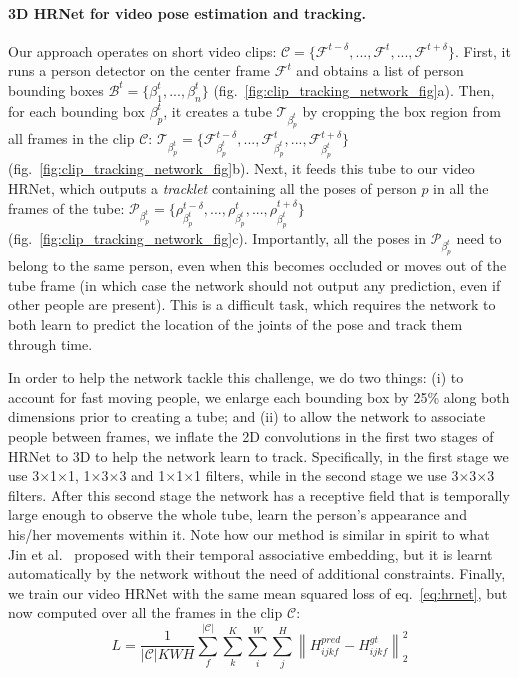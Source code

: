 \documentclass[10pt,twocolumn,letterpaper]{article}
\begin{document}
\paragraph{3D HRNet for video pose estimation and tracking.} Our approach operates on short video clips: {\small $\mathcal{C} = \{\mathcal{F}^{t-\delta}, ..., \mathcal{F}^t, ..., \mathcal{F}^{t+\delta}\}$}. 
First, it runs a person detector on the center frame $\mathcal{F}^t$ and obtains a list of person bounding boxes {\small $\mathcal{B}^t = \{\beta_1^t, ..., \beta_n^t\}$} (fig.~\ref{fig:clip_tracking_network_fig}{\color{red}a}).
Then, for each bounding box {\small $\beta_p^t$}, it creates a tube {\small $\mathcal{T}_{\beta_p^t}$}  by cropping the box region from all frames in the clip {\small $\mathcal{C}$: $\mathcal{T}_{\beta_p^t}= \{ \mathcal{F}_{\beta_p^t}^{t-\delta}, ..., \mathcal{F}_{\beta_p^t}^t, ..., \mathcal{F}_{\beta_p^t}^{t+\delta}\}$} (fig.~\ref{fig:clip_tracking_network_fig}{\color{red}b}). Next, it feeds this tube to our video HRNet, which outputs a {\it tracklet} containing all the poses of person $p$ in all the frames of the tube: {\small $\mathcal{P}_{\beta_p^t} = \{\rho_{\beta_p^t}^{t-\delta}, ..., \rho_{\beta_p^t}^t, ..., \rho_{\beta_p^t}^{t+\delta}\}$} (fig.~\ref{fig:clip_tracking_network_fig}{\color{red}c}).
Importantly, all the poses in $\mathcal{P}_{\beta_p^t}$ need to belong to the same person, even when this becomes occluded or moves out of the tube frame (in which case the network should not output any prediction, even if other people are present). This is a difficult task, which requires the network to both learn to predict the location of the joints of the pose and track them through time. 


In order to help the network tackle this challenge, we do two things: (i) to account for fast moving people, we enlarge each bounding box by 25\% along both dimensions prior to creating a tube; and (ii) to allow the network to associate people between frames, we inflate the 2D convolutions in the first two stages of HRNet to 3D to help the network learn to track. Specifically, in the first stage 
we use {\small 3$\times$1$\times$1, 1$\times$3$\times$3 and 1$\times$1$\times$1} filters, while in the second stage we use {\small3$\times$3$\times$3} filters. After this second stage the network has a receptive field that is temporally large enough to observe the whole tube, learn the person's appearance and his/her movements within it. 
Note how our method is similar in spirit to what Jin et al.~\cite{jin2019multi} proposed with their temporal associative embedding, but it is learnt automatically by the network without the need of additional constraints. 
Finally, we train our video HRNet with the same mean squared loss of eq.~\ref{eq:hrnet}, but now computed over all the frames in the clip $\mathcal{C}$:
\begin{equation}
L = \frac{1}{|\mathcal{C}| K W H}\sum_f^{|\mathcal{C}|} \sum_k^{K} \sum_i^W \sum_j^H \left\lVert H_{ijkf}^{pred} - H_{ijkf}^{gt} \right\rVert _2^2
\end{equation}
\end{document}
